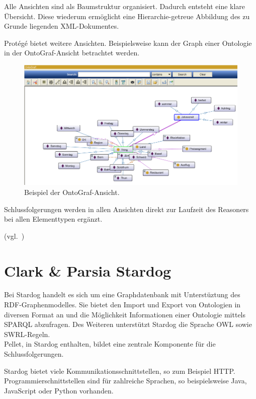 Alle Ansichten sind als Baumstruktur organisiert. Dadurch entsteht eine klare Übersicht. Diese wiederum ermöglicht eine Hierarchie-getreue Abbildung des zu Grunde liegenden XML-Dokumentes.

Protégé bietet weitere Ansichten. Beispielsweise kann der Graph einer Ontologie in der OntoGraf-Ansicht betrachtet werden.

\begin{figure}[H]%
    \centering
    \includegraphics[scale=0.7]{bilder/OntoGraf.png}
    \caption{Beispiel der OntoGraf-Ansicht.\label{fig:kompo:ontograf}\protect\footnotemark}
\end{figure}

Schlussfolgerungen werden in allen Ansichten direkt zur Laufzeit des Reasoners bei allen Elementtypen ergänzt.

(vgl.~\cite{protegeView})

\section{Clark \& Parsia Stardog}
\label{sec:komponenten_stardog}
Bei Stardog handelt es sich um eine Graphdatenbank mit Unterstüztung des RDF-Graphenmodelles. Sie bietet den Import und Export von Ontologien in diversen Format an und die Möglichkeit Informationen einer Ontologie mittels SPARQL abzufragen. Des Weiteren unterstützt Stardog die Sprache OWL sowie SWRL-Regeln.\\
Pellet, in Stardog enthalten, bildet eine zentrale Komponente für die Schlussfolgerungen.

Stardog bietet viele Kommunikationsschnittstellen, so zum Beispiel HTTP.\\
Programmierschnittstellen sind für zahlreiche Sprachen, so beispielsweise Java, JavaScript oder Python vorhanden.

